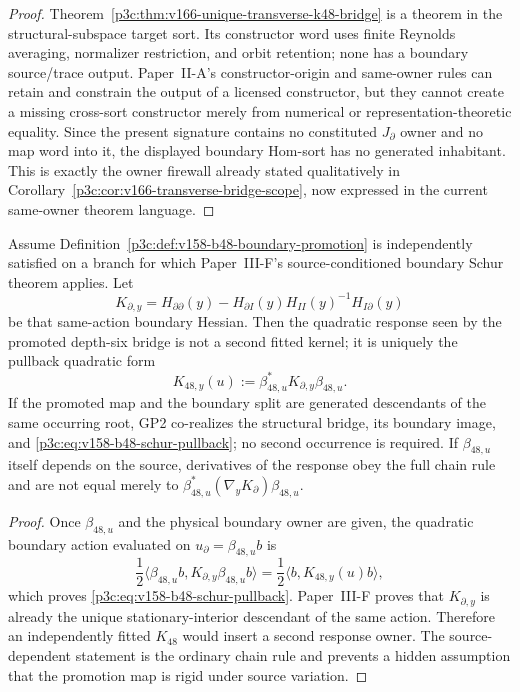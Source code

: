 \documentclass[12pt,a4paper]{article}
\begin{document}
\begin{proof}
Theorem~\ref{p3c:thm:v166-unique-transverse-k48-bridge} is a theorem in the
structural-subspace target sort.  Its constructor word uses finite Reynolds
averaging, normalizer restriction, and orbit retention; none has a boundary
source/trace output.  Paper~II-A's constructor-origin and same-owner rules can
retain and constrain the output of a licensed constructor, but they cannot
create a missing cross-sort constructor merely from numerical or
representation-theoretic equality.  Since the present signature contains no
constituted \(J_\partial\) owner and no map word into it, the displayed
boundary Hom-sort has no generated inhabitant.  This is exactly the owner
firewall already stated qualitatively in
Corollary~\ref{p3c:cor:v166-transverse-bridge-scope}, now expressed in the
current same-owner theorem language.
\end{proof}

\begin{theorem}
\label{p3c:thm:v158-b48-schur-factorization}
Assume Definition~\ref{p3c:def:v158-b48-boundary-promotion} is independently
satisfied on a branch for which Paper~III-F's source-conditioned boundary
Schur theorem applies.  Let
\[
 K_{\partial,y}
 =H_{\partial\partial}(y)
  -H_{\partial I}(y)H_{II}(y)^{-1}H_{I\partial}(y)
\]
be that same-action boundary Hessian.  Then the quadratic response seen by
the promoted depth-six bridge is not a second fitted kernel; it is uniquely
the pullback quadratic form
\begin{equation}
 \label{p3c:eq:v158-b48-schur-pullback}
 \boxed{
 K_{48,y}(u)
 :=\beta_{48,u}^{*}K_{\partial,y}\beta_{48,u}.}
\end{equation}
If the promoted map and the boundary split are generated descendants of the
same occurring root, GP2 co-realizes the structural bridge, its boundary
image, and \eqref{p3c:eq:v158-b48-schur-pullback}; no second occurrence is
required.  If \(\beta_{48,u}\) itself depends on the source, derivatives of
the response obey the full chain rule and are not equal merely to
\(\beta_{48,u}^{*}(\nabla_yK_\partial)\beta_{48,u}\).
\end{theorem}

\begin{proof}
Once \(\beta_{48,u}\) and the physical boundary owner are given, the
quadratic boundary action evaluated on
\(u_\partial=\beta_{48,u}b\) is
\[
 \frac12\langle \beta_{48,u}b,
 K_{\partial,y}\beta_{48,u}b\rangle
 =\frac12\langle b,K_{48,y}(u)b\rangle,
\]
which proves \eqref{p3c:eq:v158-b48-schur-pullback}.  Paper~III-F proves that
\(K_{\partial,y}\) is already the unique stationary-interior descendant of
the same action.  Therefore an independently fitted \(K_{48}\) would insert a
second response owner.  The source-dependent statement is the ordinary
chain rule and prevents a hidden assumption that the promotion map is rigid
under source variation.
\end{proof}
\end{document}
